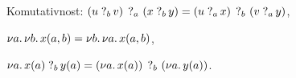 \begin{axiom}{Komutativnost:}\label{ax-10}
    \( \measure{a}{\measureraw{b}{u}{v}}{\measureraw{b}{x}{y}}
        = \measure{b}{\measureraw{a}{u}{x}}{\measureraw{a}{v}{y}} \),
\end{axiom}

\begin{axiom}{}\label{ax-11}
    \( \new{a}{\new{b}{x{\p{a,b}}}} = \new{b}{\new{a}{x{\p{a,b}}}} \),
\end{axiom}

\begin{axiom}{}\label{ax-12}
    \( \new{a}{\measureraw{b}{x{\p a}}{y{\p a}}}
        = \measure{b}{\new{a}{x{\p a}}}{\new{a}{y{\p a}}} \).
\end{axiom}


